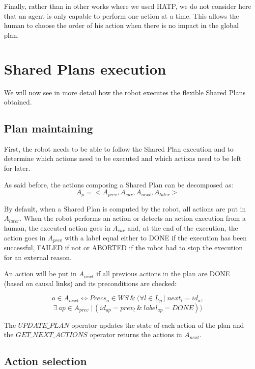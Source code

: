 \documentclass[english,a4paper,11pt,twoside]{StyleThese}
\begin{document}
Finally, rather than in other works where we used HATP, we do not consider here that an agent is only capable to perform one action at a time. This allows the human to choose the order of his action when there is no impact in the global plan.

\section{Shared Plans execution}

We will now see in more detail how the robot executes the flexible Shared Plans obtained.

\subsection{Plan maintaining}
\label{subsec:maintaining}

First, the robot needs to be able to follow the Shared Plan execution and to determine which actions need to be executed and which actions need to be left for later. 

As said before, the actions composing a Shared Plan can be decomposed as:
$$A_p = <A_{prev}, A_{cur}, A_{next}, A_{later}>$$

By default, when a Shared Plan is computed by the robot, all actions are put in $A_{later}$. When the robot performs an action or detects an action execution from a human, the executed action goes in $A_{cur}$ and, at the end of the execution, the action goes in $A_{prev}$ with a label equal either to DONE if the execution has been successful, FAILED if not or ABORTED if the robot had to stop the execution for an external reason.

An action will be put in $A_{next}$ if all previous actions in the plan are DONE (based on causal links) and its preconditions are checked:

$$a \in A_{next} \Leftrightarrow Precs_{a} \in WS \ \& \ (\forall l \in L_p \ | \ next_l = id_a,$$ 
$$\exists \ ap \in A_{prev} \ | \ (id_{ap} = prev_l \ \& \ label_{ap}  = DONE))$$

The $UPDATE\_PLAN$ operator updates the state of each action of the plan and the $GET\_NEXT\_ACTIONS$ operator returns the actions in $A_{next}$.


\subsection{Action selection}
\label{subsec:selection}
\end{document}
